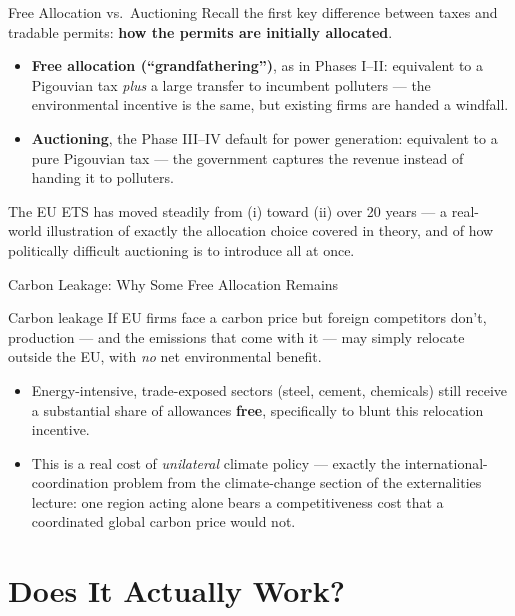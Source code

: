 \documentclass[11pt,aspectratio=169]{beamer}
\begin{document}
\begin{frame}{Free Allocation vs.\ Auctioning}
  Recall the first key difference between taxes and tradable permits: \textbf{how the permits are initially allocated}.
  \begin{itemize}
    \item \textbf{Free allocation (``grandfathering'')}, as in Phases I--II: equivalent to a Pigouvian tax \emph{plus} a large transfer to incumbent polluters --- the environmental incentive is the same, but existing firms are handed a windfall.
    \item \textbf{Auctioning}, the Phase III--IV default for power generation: equivalent to a pure Pigouvian tax --- the government captures the revenue instead of handing it to polluters.
  \end{itemize}
  \small The EU ETS has moved steadily from (i) toward (ii) over 20 years --- a real-world illustration of exactly the allocation choice covered in theory, and of how politically difficult auctioning is to introduce all at once.
\end{frame}

\begin{frame}{Carbon Leakage: Why Some Free Allocation Remains}
  \begin{block}{Carbon leakage}
    If EU firms face a carbon price but foreign competitors don't, production --- and the emissions that come with it --- may simply relocate outside the EU, with \emph{no} net environmental benefit.
  \end{block}
  \begin{itemize}
    \item Energy-intensive, trade-exposed sectors (steel, cement, chemicals) still receive a substantial share of allowances \textbf{free}, specifically to blunt this relocation incentive.
    \item This is a real cost of \emph{unilateral} climate policy --- exactly the international-coordination problem from the climate-change section of the externalities lecture: one region acting alone bears a competitiveness cost that a coordinated global carbon price would not.
  \end{itemize}
\end{frame}

\section{Does It Actually Work?}
\end{document}
